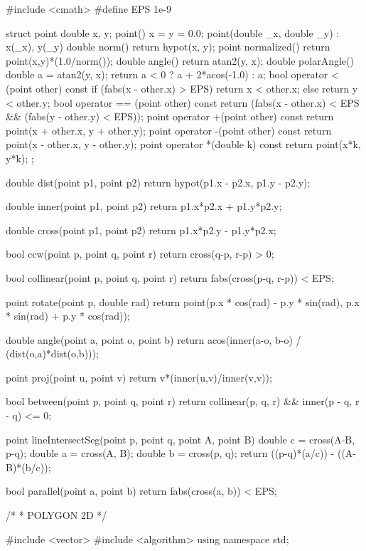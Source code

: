 \documentclass[11pt]{article}
\begin{document}
\begingroup\scriptsize
\begin{vncode}
#include <cmath>
#define EPS 1e-9

struct point {
	double x, y;
	point() { x = y = 0.0; }
	point(double _x, double _y) : x(_x), y(_y) {}
	double norm() {
		return hypot(x, y);
	}
	point normalized() {
		return point(x,y)*(1.0/norm());
	}
	double angle() { return atan2(y, x); }
	double polarAngle() {
		double a = atan2(y, x);
		return a < 0 ? a + 2*acos(-1.0) : a;
	}
	bool operator < (point other) const {
		if (fabs(x - other.x) > EPS) return x < other.x;
		else return y < other.y;
	}
	bool operator == (point other) const {
		return (fabs(x - other.x) < EPS && (fabs(y - other.y) < EPS));
	}
	point operator +(point other) const{
		return point(x + other.x, y + other.y);
	}
	point operator -(point other) const{
		return point(x - other.x, y - other.y);
	}
	point operator *(double k) const{
		return point(x*k, y*k);
	}
};

double dist(point p1, point p2) {
	return hypot(p1.x - p2.x, p1.y - p2.y);
}

double inner(point p1, point p2) {
	return p1.x*p2.x + p1.y*p2.y;
}

double cross(point p1, point p2) {
	return p1.x*p2.y - p1.y*p2.x;
}

bool ccw(point p, point q, point r) {
	return cross(q-p, r-p) > 0;
}

bool collinear(point p, point q, point r) {
	return fabs(cross(p-q, r-p)) < EPS;
}

point rotate(point p, double rad) {
	return point(p.x * cos(rad) - p.y * sin(rad),
	p.x * sin(rad) + p.y * cos(rad));
}

double angle(point a, point o, point b) {
	return acos(inner(a-o, b-o) / (dist(o,a)*dist(o,b)));
}

point proj(point u, point v) {
	return v*(inner(u,v)/inner(v,v));
}

bool between(point p, point q, point r) {
    return collinear(p, q, r) && inner(p - q, r - q) <= 0;
}

point lineIntersectSeg(point p, point q, point A, point B) {
	double c = cross(A-B, p-q);
	double a = cross(A, B);
	double b = cross(p, q);
	return ((p-q)*(a/c)) - ((A-B)*(b/c));
}

bool parallel(point a, point b) {
	return fabs(cross(a, b)) < EPS;
}

/*
 * POLYGON 2D
 */

#include <vector>
#include <algorithm>
using namespace std;


\end{vncode}
\end{document}
